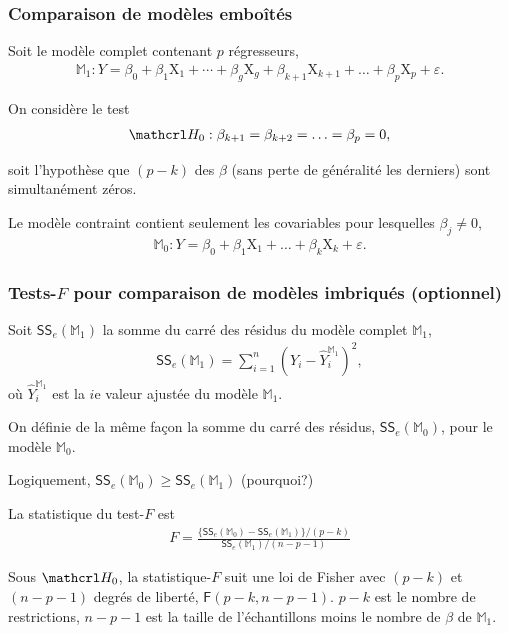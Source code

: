 \documentclass[xcolor={dvipsnames}]{beamer}
\begin{document}
\begin{frame}
\frametitle{Comparaison de modèles emboîtés}
\bi
\item Soit le  \alert{modèle complet} contenant $p$ régresseurs,
\begin{align*}
\mathbb{M}_1: Y=\beta_0+\beta_1 \mathrm{X}_1 + \cdots + \beta_g \mathrm{X}_g + \beta_{k+1}\mathrm{X}_{k+1} + \ldots + \beta_p \mathrm{X}_p + \varepsilon.
\end{align*}
\item On considère le test
\begin{align*}
\Hy_0: \beta_{k+1}=\beta_{k+2}=\ldots=\beta_p=0,
\end{align*}
\item  soit l'hypothèse que $(p-k)$ des $\beta$ (sans perte de généralité les derniers) sont simultanément zéros.
\item Le \alert{modèle contraint} contient seulement les covariables pour lesquelles $\beta_j \neq 0$,
\begin{align*}
\mathbb{M}_0: Y=\beta_0+\beta_1 \mathrm{X}_1 + \ldots + \beta_k \mathrm{X}_k + \varepsilon.
\end{align*}
\ei
\end{frame}



\begin{frame}[fragile]
\frametitle{Tests-$F$ pour comparaison de modèles imbriqués (optionnel)}
\bi
\item Soit $\mathsf{SS}_e(\mathbb{M}_1)$ la somme du carré des résidus du modèle complet $\mathbb{M}_1$,
\begin{align*}
\mathsf{SS}_e(\mathbb{M}_1)=\sum_{i=1}^n (Y_i-\hat{Y}_i^{\mathbb{M}_1})^2,
\end{align*}
où $\hat{Y}_i^{\mathbb{M}_1}$ est la  $i$e valeur ajustée du  modèle $\mathbb{M}_1$.
\item On définie de la même façon la somme du carré des résidus,  $\mathsf{SS}_e(\mathbb{M}_0)$, pour le modèle $\mathbb{M}_0$.
\item 
Logiquement, $\mathsf{SS}_e(\mathbb{M}_0) \geq \mathsf{SS}_e(\mathbb{M}_1)$ (pourquoi?)
\ei 
\end{frame}
\begin{frame}[fragile]
La statistique du test-$F$ est
\begin{align*}
F=\frac{\{\mathsf{SS}_e(\mathbb{M}_0)-\mathsf{SS}_e(\mathbb{M}_1)\}/(p-k)}{\mathsf{SS}_e(\mathbb{M}_1)/(n-p-1)}
\end{align*}
\bi 
\item Sous $\Hy_0$, la statistique-$F$  suit une  \alert{loi de Fisher} avec $(p-k)$ et $(n-p-1)$ degrés de liberté, $\mathsf{F}(p-k, n-p-1)$. 
\ei
{\footnotesize  $p-k$ est le nombre de restrictions, $n-p-1$ est la taille de l'échantillons moins le nombre de $\beta$ de $\mathbb{M}_1$.}
\end{frame}
\end{document}
